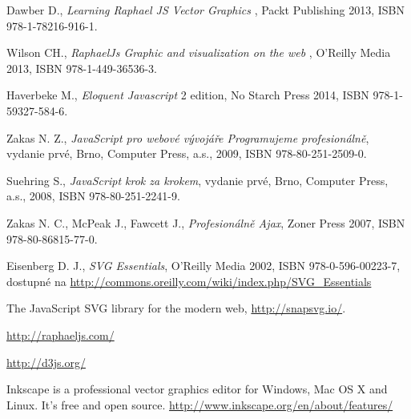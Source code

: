 \begin{thebibliography}{99}                                \label{literatura}

Dawber D.,
{\it Learning Raphael JS Vector Graphics }, 
 Packt Publishing 2013, ISBN 978-1-78216-916-1.
         
 
 
 Wilson CH., {\it RaphaelJs Graphic and visualization on the web} , 
O'Reilly Media 2013, ISBN 978-1-449-36536-3.
         

Haverbeke M., 
{\it Eloquent Javascript} 2 edition, No Starch Press 2014, ISBN 978-1-59327-584-6.


Zakas N. Z., 
{\it JavaScript pro webové vývojáře Programujeme profesionálně},
 vydanie prvé, Brno, Computer Press, a.s., 2009,  ISBN 978-80-251-2509-0.

Suehring S., 
{\it JavaScript krok za krokem},
vydanie prvé, Brno, Computer Press, a.s., 2008, ISBN 978-80-251-2241-9.

Zakas N. C., McPeak J., Fawcett J.,
{\it Profesionálně Ajax},
Zoner Press 2007,  ISBN 978-80-86815-77-0.

Eisenberg D. J., {\it SVG Essentials}, 
O'Reilly Media 2002, ISBN  978-0-596-00223-7,  dostupné na \url{http://commons.oreilly.com/wiki/index.php/SVG_Essentials}


The JavaScript SVG library for the modern web,
\url{http://snapsvg.io/}.



\url{ http://raphaeljs.com/}

\url {http://d3js.org/}


Inkscape is a professional vector graphics editor for Windows, Mac OS X and Linux. It's free and open source.
\url {http://www.inkscape.org/en/about/features/}

\end{thebibliography}